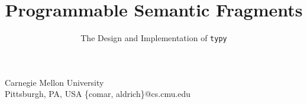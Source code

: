 \documentclass[10pt]{sigplanconf}
\begin{document}

\title{Programmable Semantic Fragments}
\subtitle{The Design and Implementation of \texttt{typy}}


          {          Carnegie Mellon University \\ {Pittsburgh, PA, USA}}
          {\{comar, aldrich\}@cs.cmu.edu\vspace{-6px}}   

\maketitle
\end{document}
